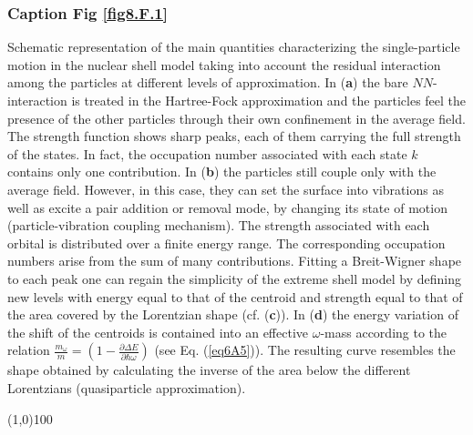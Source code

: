 \subsubsection{Caption Fig \ref{fig8.F.1}}
Schematic representation of the main quantities characterizing the single-particle motion in the nuclear shell model taking into account the residual interaction among the particles at different levels of approximation.
In (\textbf{a}) the bare $NN$-interaction is treated in the Hartree-Fock approximation and the particles feel the presence of the other particles through their own confinement in the average field. The strength function shows sharp peaks, each of them carrying the full strength of the states. In fact, the occupation number associated with each state $k$ contains only one contribution. In (\textbf{b}) the particles still couple   only  with the average field. However, in this case, they can set the surface into vibrations as well as excite a pair addition or removal mode, by changing its state of motion (particle-vibration coupling mechanism). The strength associated with each orbital is distributed over a finite energy range. The corresponding occupation numbers arise from the sum of many contributions. Fitting a Breit-Wigner  shape to each peak one can regain the simplicity of the extreme shell model by defining new levels with energy equal to that of the centroid and strength equal to that of the area covered by the Lorentzian shape (cf. (\textbf{c})). In (\textbf{d}) the energy variation of the shift of the centroids is contained into an effective $\omega$-mass according to the relation $\frac{m_\omega}{m}=\left(1-\frac{\partial \Delta E}{\partial \hbar \omega}\right)$ (see Eq. (\ref{eq6A5})). The resulting curve resembles the shape obtained by calculating the inverse of the area below the different Lorentzians (quasiparticle approximation).
\begin{center}
	\line(1,0){100}
\end{center}









%
% 

